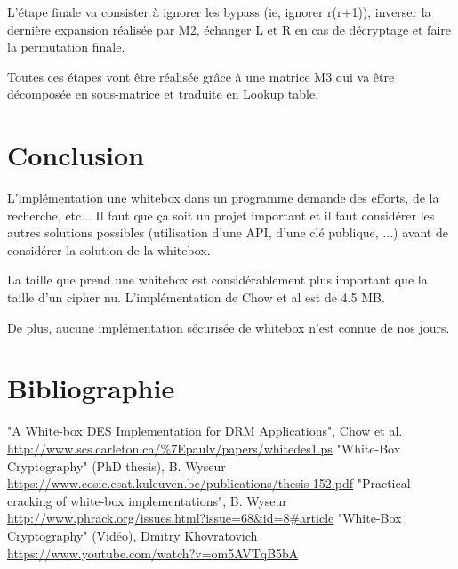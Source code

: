 \documentclass[a4paper,12pt]{article}
\begin{document}
L'étape finale va consister à ignorer les bypass (ie, ignorer r(r+1)), inverser la dernière expansion réalisée par M2, échanger L et R en cas de décryptage et faire la permutation finale.

Toutes ces étapes vont être réalisée grâce à une matrice M3 qui va être décomposée en sous-matrice et traduite en Lookup table.

\newpage

\section{Conclusion}

L'implémentation une whitebox dans un programme demande des efforts, de la recherche, etc... Il faut que ça soit un projet important et il faut considérer les autres solutions possibles (utilisation d'une API, d'une clé publique, ...) avant de considérer la solution de la whitebox.

La taille que prend une whitebox est considérablement plus important que la taille d'un cipher nu. L'implémentation de Chow et al est de 4.5 MB.

De plus, aucune implémentation sécurisée de whitebox n'est connue de nos jours.

\newpage

\section{Bibliographie}

"A White-box DES Implementation for DRM Applications", Chow et al.\\
\url{http://www.scs.carleton.ca/%7Epaulv/papers/whitedes1.ps}
"White-Box Cryptography" (PhD thesis), B. Wyseur\\
\url{https://www.cosic.esat.kuleuven.be/publications/thesis-152.pdf}
"Practical cracking of white-box implementations", B. Wyseur\\
\url{http://www.phrack.org/issues.html?issue=68&id=8#article}
"White-Box Cryptography" (Vidéo), Dmitry Khovratovich\\
\url{https://www.youtube.com/watch?v=om5AVTqB5bA}
\end{document}
